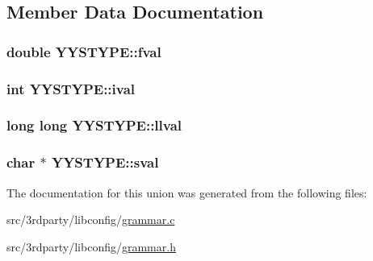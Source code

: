 \subsection{Member Data Documentation}
\hypertarget{unionYYSTYPE_a31eb6403902c1580af29230db1ecc872}{
\subsubsection[{fval}]{\setlength{\rightskip}{0pt plus 5cm}double Y\-Y\-S\-T\-Y\-P\-E\-::fval}}\label{unionYYSTYPE_a31eb6403902c1580af29230db1ecc872}
\hypertarget{unionYYSTYPE_ae9d3f6cba410d8f367f34437acf8c9a2}{
\subsubsection[{ival}]{\setlength{\rightskip}{0pt plus 5cm}int Y\-Y\-S\-T\-Y\-P\-E\-::ival}}\label{unionYYSTYPE_ae9d3f6cba410d8f367f34437acf8c9a2}
\hypertarget{unionYYSTYPE_a943fdbe79b7f976c66089ab5170dff54}{
\subsubsection[{llval}]{\setlength{\rightskip}{0pt plus 5cm}long long Y\-Y\-S\-T\-Y\-P\-E\-::llval}}\label{unionYYSTYPE_a943fdbe79b7f976c66089ab5170dff54}
\hypertarget{unionYYSTYPE_a73a5074a72319891e5442106deeb667b}{
\subsubsection[{sval}]{\setlength{\rightskip}{0pt plus 5cm}char $\ast$ Y\-Y\-S\-T\-Y\-P\-E\-::sval}}\label{unionYYSTYPE_a73a5074a72319891e5442106deeb667b}


The documentation for this union was generated from the following files\-:\begin{DoxyCompactItemize}
\item 
src/3rdparty/libconfig/\hyperlink{grammar_8c}{grammar.\-c}\item 
src/3rdparty/libconfig/\hyperlink{grammar_8h}{grammar.\-h}\end{DoxyCompactItemize}
